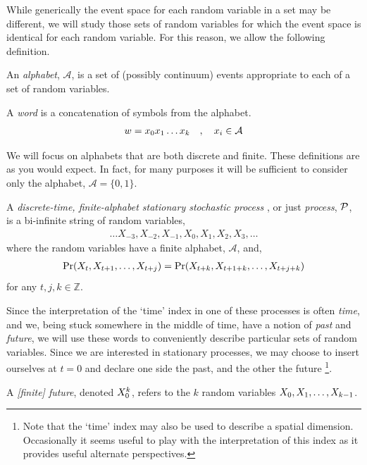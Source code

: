 While generically the event space for each random variable in a set may be different, we will study those sets of random variables for which the event space is identical for each random variable. For this reason, we allow the following definition.
\begin{Def}
An \emph{alphabet}, $\mathcal{A}$, is a set of (possibly continuum) events appropriate to each of a set of random variables.
\end{Def}
\begin{Def}
A \emph{word} is a concatenation of symbols from the alphabet.
\begin{align*}
w = {x}_0 {x}_1 \ldots {x}_k \quad , \quad {x}_i \in \mathcal{A}
\end{align*}
\end{Def}
We will focus on alphabets that are both discrete and finite. These definitions are as you would expect. In fact, for many purposes it will be sufficient to consider only the alphabet, $\mathcal{A} = \{0,1\}$. 
\begin{Def}
A \emph{discrete-time, finite-alphabet stationary stochastic process} , or just \emph{process}, $\mathcal{P}$, is a bi-infinite string of random variables,
\begin{align*}
\ldots X_{-3}, X_{-2}, X_{-1}, X_{0}, X_{1}, X_{2}, X_{3}, \ldots
\end{align*}
where the random variables have a finite alphabet, $\mathcal{A}$, and,
\begin{align*}
\Pr(X_{t}, X_{t+1}, \ldots, X_{t+j}) = \Pr(X_{t+k}, X_{t+1+k}, \ldots, X_{t+j+k}) 
\end{align*}
for any $t,j,k \in \mathbb{Z}$.
\end{Def}
Since the interpretation of the `time' index in one of these processes is often \emph{time}, and we, being stuck somewhere in the middle of time, have a notion of \emph{past} and \emph{future}, we will use these words to conveniently describe particular sets of random variables. Since we are interested in stationary processes, we may choose to insert ourselves at $t=0$ and declare one side the past, and the other the future \footnote{Note that the `time' index may also be used to describe a spatial dimension. Occasionally it seems useful to play with the interpretation of this index as it provides useful alternate perspectives.}.
\begin{Def}
A \emph{[finite] future}, denoted ${X}_{0}^{k}$, refers to the $k$ random variables ${X}_{0}, {X}_{1}, \ldots, {X}_{k-1}$.
\end{Def}
